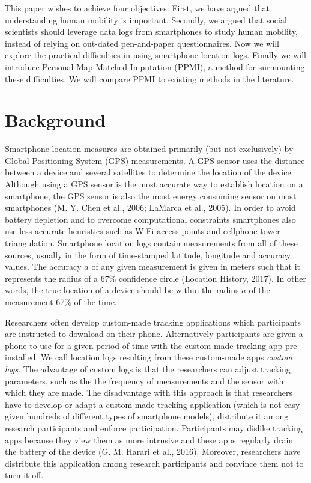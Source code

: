 \documentclass[man]{apa6}
\theoremstyle{definition}
\theoremstyle{definition}
\theoremstyle{definition}
\theoremstyle{remark}
\begin{document}
This paper wishes to achieve four objectives: First, we have argued that
understanding human mobility is important. Secondly, we argued that
social scientists should leverage data logs from smartphones to study
human mobility, instead of relying on out-dated pen-and-paper
questionnaires. Now we will explore the practical difficulties in using
smartphone location logs. Finally we will introduce Personal Map Matched
Imputation (PPMI), a method for surmounting these difficulties. We will
compare PPMI to existing methods in the literature.

\section{Background}\label{background}

Smartphone location measures are obtained primarily (but not
exclusively) by Global Positioning System (GPS) measurements. A GPS
sensor uses the distance between a device and several satellites to
determine the location of the device. Although using a GPS sensor is the
most accurate way to establish location on a smartphone, the GPS sensor
is also the most energy consuming sensor on most smartphones (M. Y. Chen
et al., 2006; LaMarca et al., 2005). In order to avoid battery depletion
and to overcome computational constraints smartphones also use
less-accurate heuristics such as WiFi access points and cellphone tower
triangulation. Smartphone location logs contain measurements from all of
these sources, usually in the form of time-stamped latitude, longitude
and accuracy values. The accuracy \(a\) of any given measurement is
given in meters such that it represents the radius of a 67\% confidence
circle (Location History, 2017). In other words, the true location of a
device should be within the radius \(a\) of the measurement 67\% of the
time.

Researchers often develop custom-made tracking applications which
participants are instructed to download on their phone. Alternatively
participants are given a phone to use for a given period of time with
the custom-made tracking app pre-installed. We call location logs
resulting from these custom-made apps \emph{custom logs}. The advantage
of custom logs is that the researchers can adjust tracking parameters,
such as the the frequency of measurements and the sensor with which they
are made. The disadvantage with this approach is that researchers have
to develop or adapt a custom-made tracking application (which is not
easy given hundreds of different types of smartphone models), distribute
it among research participants and enforce participation. Participants
may dislike tracking apps because they view them as more intrusive and
these apps regularly drain the battery of the device (G. M. Harari et
al., 2016). Moreover, researchers have distribute this application among
research participants and convince them not to turn it off.
\end{document}
